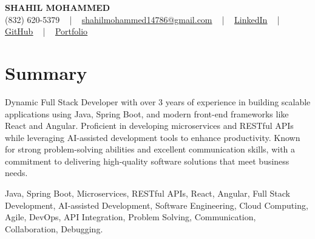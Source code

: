 \documentclass[letterpaper,10pt]{article}
\begin{document}
\begin{center}
    {\fontsize{14pt}{12pt}\selectfont \textbf{\MakeUppercase{Shahil Mohammed}}}\\ \vspace{2pt}
    \fontsize{10pt}{12pt}\selectfont (832) 620-5379 ~ | ~ \href{mailto:shahilmohammed14786@gmail.com}{shahilmohammed14786@gmail.com} ~ | ~  
    \href{https://www.linkedin.com/in/shahil-mohammed-9652931a1/}{\color{blue}\underline{LinkedIn}}  ~ | ~ 
    \href{https://github.com/freakbeast14}{\color{blue}\underline{GitHub}} ~ | ~ 
    \href{https://shahil-mohammed.netlify.app/}{\color{blue}\underline{Portfolio}}
    \vspace{-8pt}
\end{center}

\section{Summary}
\vspace{-2pt}\fontsize{8pt}{9pt}\selectfont
Dynamic Full Stack Developer with over 3 years of experience in building scalable applications using Java, Spring Boot, and modern front-end frameworks like React and Angular. Proficient in developing microservices and RESTful APIs while leveraging AI-assisted development tools to enhance productivity. Known for strong problem-solving abilities and excellent communication skills, with a commitment to delivering high-quality software solutions that meet business needs.
 \vspace{-5pt}
 
{\fontsize{1pt}{1pt}\selectfont\color{white}
Java, Spring Boot, Microservices, RESTful APIs, React, Angular, Full Stack Development, AI-assisted Development, Software Engineering, Cloud Computing, Agile, DevOps, API Integration, Problem Solving, Communication, Collaboration, Debugging.
}
\vspace{-8pt}

\vspace{-2pt}
\end{document}
